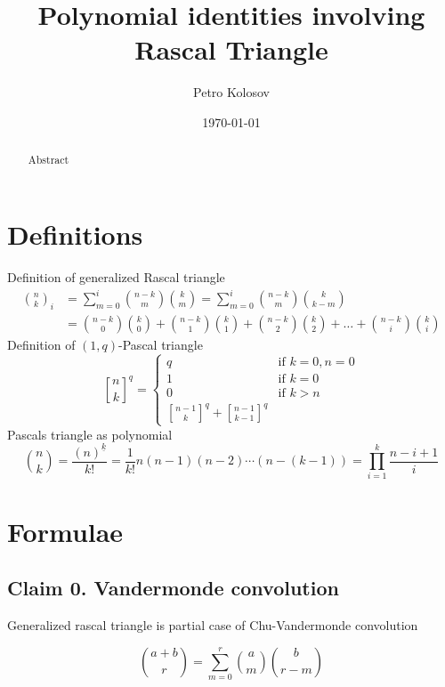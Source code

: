 \documentclass[12pt,letterpaper,oneside,reqno]{amsart}
\title[Polynomial identities involving Rascal Triangle]
{Polynomial identities involving Rascal Triangle}
\author[Petro Kolosov]{Petro Kolosov}
\date{\today}
\newcommand \fallingFactorial [2] {\left(#1 \right)^{\underline{#2}}}
\newcommand \rascalNumber [3] {\binom{#1}{#2}_{#3}}
\newcommand{\genstirlingI}[3]{%
    \genfrac{[}{]}{0pt}{#1}{#2}{#3}%
}
\newcommand{\oneQBinomial}[3]{\genstirlingI{}{#1}{#2}^{#3}}
\numberwithin{equation}{section}
\begin{document}
\begin{abstract}
    Abstract
\end{abstract}

\tableofcontents

\maketitle


\section{Definitions}
Definition of generalized Rascal triangle
\begin{align}
    \rascalNumber{n}{k}{i} &= \sum_{m=0}^{i} \binom{n-k}{m} \binom{k}{m} = \sum_{m=0}^{i} \binom{n-k}{m} \binom{k}{k-m} \\
    &= \binom{n-k}{0} \binom{k}{0} + \binom{n-k}{1} \binom{k}{1} + \binom{n-k}{2} \binom{k}{2} + \ldots + \binom{n-k}{i} \binom{k}{i}
\end{align}
Definition of $(1, q)$-Pascal triangle
\begin{equation*}
    \oneQBinomial{n}{k}{q} =
    \begin{cases}
        q & \text{if } k=0, n=0 \\
        1 & \text{if } k=0 \\
        0 & \text{if } k > n \\
        \oneQBinomial{n-1}{k}{q} + \oneQBinomial{n-1}{k-1}{q}
    \end{cases}
\end{equation*}
Pascals triangle as polynomial
\begin{equation}
    \binom{n}{k}= \frac{\fallingFactorial{n}{k}}{k!}= \frac{1}{k!} n(n-1)(n-2)\cdots (n-(k-1)) = \prod_{i=1}^{k} \frac{n-i+1}{i}
\end{equation}


\section{Formulae}\label{sec:formulae}

\subsection{Claim 0. Vandermonde convolution} Generalized rascal triangle is partial case of Chu-Vandermonde convolution

\begin{equation*}
    \binom{a+b}{r} = \sum_{m=0}^{r} \binom{a}{m} \binom{b}{r-m}
\end{equation*}
\end{document}
